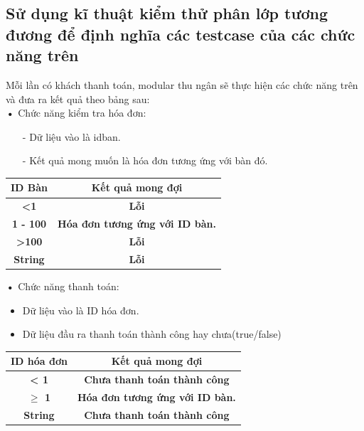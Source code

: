\documentclass[a4paper,12pt]{report}
\begin{document}
\subsection{Sử dụng kĩ thuật kiểm thử phân lớp tương đương để định nghĩa các testcase của các chức năng trên}
Mỗi lần có khách thanh toán, modular thu ngân sẽ thực hiện các chức năng trên và đưa ra kết quả theo bảng sau:\\
\textbf{•} Chức năng kiểm tra hóa đơn:
\begin{itemize}
\item[-] Dữ liệu vào là idban.
\item[-] Kết quả mong muốn là hóa đơn tương ứng với bàn đó.
\end{itemize}
\begin{longtable}{|c|c|}
\hline
\textbf{ID Bàn}   			& \textbf{Kết quả mong đợi} \\
\hline
\textbf{<1} &\textbf{ Lỗi} \\
\hline
\textbf{1 - 100} & \textbf{Hóa đơn tương ứng với ID bàn.} \\
\hline
\textbf{>100} & \textbf{Lỗi}\\
\hline
\textbf{String} & \textbf{Lỗi}\\
\hline
\end{longtable}
\textbf{•} Chức năng thanh toán:
\begin{itemize}
\item Dữ liệu vào là ID hóa đơn.
\item Dữ liệu đầu ra thanh toán thành công hay chưa(true/false)
\end{itemize}
\begin{longtable}{|c|c|}
\hline
\textbf{ID hóa đơn}   			& \textbf{Kết quả mong đợi} \\
\hline
\textbf{< 1} &\textbf{ Chưa thanh toán thành công} \\
\hline
\textbf{$\geq$ 1} & \textbf{Hóa đơn tương ứng với ID bàn.} \\
\hline
\textbf{String} & \textbf{ Chưa thanh toán thành công}\\
\hline
\end{longtable}
\end{document}
